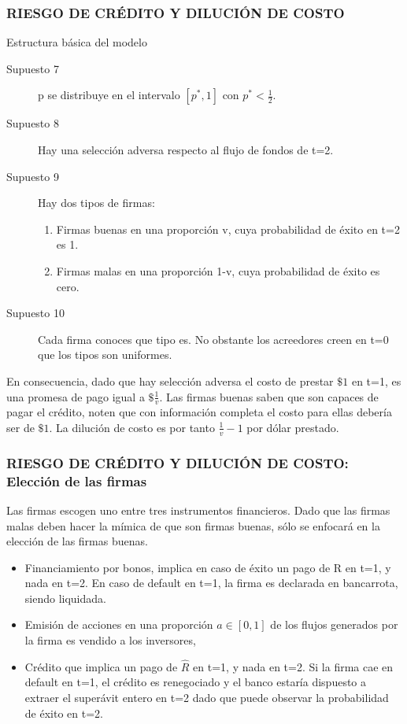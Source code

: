 \begin{frame}
\frametitle{{\normalsize RIESGO DE CRÉDITO Y DILUCIÓN DE COSTO} {}}

\begin{block} {Estructura básica del modelo}
    \begin{description}
        
        \item[Supuesto 7] p se distribuye en el intervalo $\left[p^{*}, 1 \right]  $ con $p^{*}<\frac{1}{2}$.
        \item[Supuesto 8] Hay una selección adversa respecto al flujo de fondos de t=2.
        \item[Supuesto 9] Hay dos tipos de firmas:
        \begin{enumerate}
            \item Firmas buenas en una proporción v, cuya probabilidad de éxito en t=2 es 1.
            \item Firmas malas en una proporción 1-v, cuya probabilidad de éxito es cero.
        \end{enumerate}
        \item[Supuesto 10] Cada firma conoces que tipo es. No obstante los acreedores creen en t=0 que los tipos son uniformes.
        \end{description}
    
\end{block}	
En consecuencia, dado que hay selección adversa el costo de prestar $\$1$ en t=1, es una promesa de pago igual a $\$\frac{1}{v}$. Las firmas buenas saben que son capaces de pagar el crédito, noten que con información completa el costo para ellas debería ser de $\$1$. La dilución de costo es por tanto  $\frac{1}{v}-1$ por dólar prestado.
\end{frame}


\begin{frame}
    \frametitle{{\normalsize RIESGO DE CRÉDITO Y DILUCIÓN DE COSTO: Elección de las firmas} {}}
    Las firmas escogen uno entre tres instrumentos financieros. Dado que las firmas malas deben hacer la mímica de que son firmas buenas, sólo se enfocará en la elección de las firmas buenas.\\
    \begin{itemize}
        \item Financiamiento por bonos, implica en caso de éxito un pago de R en t=1, y nada en t=2. En caso de default en t=1, la firma es declarada en bancarrota, siendo liquidada.
        \item Emisión de acciones en una proporción $a \in \left[0, 1 \right] $ de los flujos generados por la firma es vendido a los inversores,
        \item Crédito que implica un pago de $\hat{R}$ en t=1, y nada en t=2. Si la firma cae en default en t=1, el crédito es renegociado y el banco estaría dispuesto a extraer el superávit entero en t=2 dado que puede observar la probabilidad de éxito en t=2.
    \end{itemize}  
 

\end{frame}



